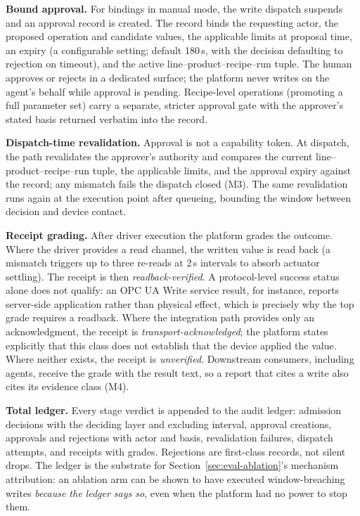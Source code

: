 \textbf{Bound approval.} For bindings in manual mode, the write dispatch
suspends and an approval record is created. The record binds the requesting
actor, the proposed operation and candidate values, the applicable limits
at proposal time, an expiry (a configurable setting; default 180\,s, with
the decision defaulting to rejection on timeout), and the active
line--product--recipe--run tuple. The
human approves or rejects in a dedicated surface; the platform never
writes on the agent's behalf while approval is pending. Recipe-level
operations (promoting a full parameter set) carry a separate, stricter
approval gate with the approver's stated basis returned verbatim into the
record.

\textbf{Dispatch-time revalidation.} Approval is not a capability token.
At dispatch, the path revalidates the approver's authority and compares
the current line--product--recipe--run tuple, the applicable limits, and
the approval expiry against the record; any mismatch fails the dispatch
closed (M3). The same revalidation runs again at the execution point after
queueing, bounding the window between decision and device contact.

\textbf{Receipt grading.} After driver execution the platform grades the
outcome. Where the driver provides a read channel, the written value is
read back (a mismatch triggers up to three re-reads at 2\,s intervals to
absorb actuator settling). The receipt is then \emph{readback-verified}.
A protocol-level success status alone does not qualify: an OPC UA Write
service result, for instance, reports server-side application rather than
physical effect, which is precisely why the top grade requires a readback.
Where the integration path provides only an acknowledgment, the receipt is
\emph{transport-acknowledged}; the platform states explicitly that this
class does not establish that the device applied the value. Where neither
exists, the receipt is \emph{unverified}. Downstream consumers, including
agents, receive the grade with the result text, so a report that cites a
write also cites its evidence class (M4).

\textbf{Total ledger.} Every stage verdict is appended to the audit ledger:
admission decisions with the deciding layer and excluding interval, approval
creations, approvals and rejections with actor and basis, revalidation
failures, dispatch attempts, and receipts with grades. Rejections are
first-class records, not silent drops. The ledger is the substrate for
Section~\ref{sec:eval-ablation}'s mechanism attribution: an ablation arm
can be shown to have executed window-breaching writes \emph{because the
ledger says so}, even when the platform had no power to stop them.


